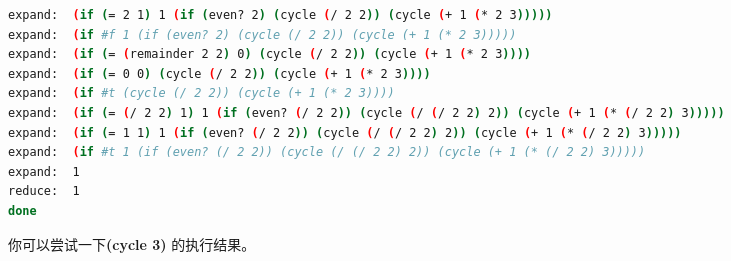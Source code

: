 \documentclass{article}
\begin{document}
\begin{CJK*}{UTF8}{gkai}
\begin{lstlisting}[language=bash, numbers=none, backgroundcolor=\color{black}, basicstyle=\scriptsize\color{green}\ttfamily\bfseries]
expand:  (if (= 2 1) 1 (if (even? 2) (cycle (/ 2 2)) (cycle (+ 1 (* 2 3)))))
expand:  (if #f 1 (if (even? 2) (cycle (/ 2 2)) (cycle (+ 1 (* 2 3)))))
expand:  (if (= (remainder 2 2) 0) (cycle (/ 2 2)) (cycle (+ 1 (* 2 3))))
expand:  (if (= 0 0) (cycle (/ 2 2)) (cycle (+ 1 (* 2 3))))
expand:  (if #t (cycle (/ 2 2)) (cycle (+ 1 (* 2 3))))
expand:  (if (= (/ 2 2) 1) 1 (if (even? (/ 2 2)) (cycle (/ (/ 2 2) 2)) (cycle (+ 1 (* (/ 2 2) 3)))))
expand:  (if (= 1 1) 1 (if (even? (/ 2 2)) (cycle (/ (/ 2 2) 2)) (cycle (+ 1 (* (/ 2 2) 3)))))
expand:  (if #t 1 (if (even? (/ 2 2)) (cycle (/ (/ 2 2) 2)) (cycle (+ 1 (* (/ 2 2) 3)))))
expand:  1
reduce:  1
done

\end{lstlisting}

你可以尝试一下{\ttfamily \bfseries (cycle 3)} 的执行结果。

\end{CJK*}
\end{document}
